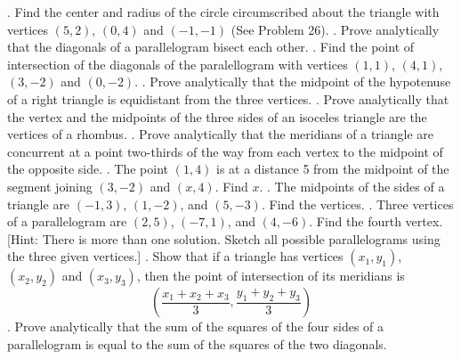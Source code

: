 \documentclass[10pt,letterpaper]{article}
\begin{document}
. Find the center and radius of the circle circumscribed about the triangle with vertices $(5,2)$, $(0,4)$ and $(-1, -1)$ (See Problem 26).
. Prove analytically that the diagonals of a parallelogram bisect each other.
. Find the point of intersection of the diagonals of the paralellogram with vertices $(1,1)$, $(4,1)$, $(3,-2)$ and $(0,-2)$.
. Prove analytically that the midpoint of the hypotenuse of a right triangle is equidistant from the three vertices.
. Prove analytically that the vertex and the midpoints of the three sides of an isoceles triangle are the vertices of a rhombus.
. Prove analytically that the meridians of a triangle are concurrent at a point two-thirds of the way from each vertex to the midpoint of the opposite side.
. The point $(1,4)$ is at a distance 5 from the midpoint of the segment joining $(3, -2)$ and $(x,4)$. Find $x$.
. The midpoints of the sides of a triangle are $(-1,3)$, $(1,-2)$, and $(5,-3)$. Find the vertices.
. Three vertices of a parallelogram are $(2,5)$, $(-7,1)$, and $(4,-6)$. Find the fourth vertex. [Hint: There is more than one solution. Sketch all possible parallelograms using the three given vertices.]
. Show that if a triangle has vertices $(x_1,y_1)$, $(x_2,y_2)$ and $(x_3,y_3)$, then the point of intersection of its meridians is 
\[ \left(\frac{x_1 + x_2 + x_3}{3}, \frac{y_1 + y_2 + y_3}{3}\right) \]
. Prove analytically that the sum of the squares of the four sides of a parallelogram is equal to the sum of the squares of the two diagonals.
\end{document}
